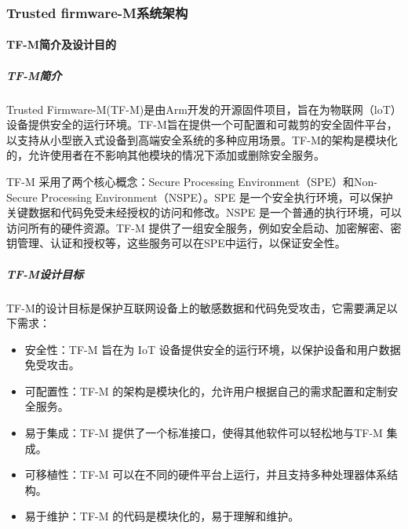 \documentclass[12pt,a4paper]{ctexart}
\numberwithin{figure}{section}
\begin{document}
\subsubsection{Trusted firmware-M系统架构}
\paragraph{TF-M简介及设计目的}
\subparagraph{TF-M简介}
\par Trusted Firmware-M(TF-M)是由Arm开发的开源固件项目，旨在为物联网（loT）设备提供安全的运行环境。TF-M旨在提供一个可配置和可裁剪的安全固件平台，以支持从小型嵌入式设备到高端安全系统的多种应用场景。TF-M的架构是模块化的，允许使用者在不影响其他模块的情况下添加或删除安全服务。
\par TF-M 采用了两个核心概念：Secure Processing Environment（SPE）和Non-Secure Processing Environment（NSPE）。SPE 是一个安全执行环境，可以保护关键数据和代码免受未经授权的访问和修改。NSPE 是一个普通的执行环境，可以访问所有的硬件资源。TF-M 提供了一组安全服务，例如安全启动、加密解密、密钥管理、认证和授权等，这些服务可以在SPE中运行，以保证安全性。
\subparagraph{TF-M设计目标}
\par TF-M的设计目标是保护互联网设备上的敏感数据和代码免受攻击，它需要满足以下需求：
\begin{itemize}
    \item 安全性：TF-M 旨在为 IoT 设备提供安全的运行环境，以保护设备和用户数据免受攻击。
    \item 可配置性：TF-M 的架构是模块化的，允许用户根据自己的需求配置和定制安全服务。
    \item 易于集成：TF-M 提供了一个标准接口，使得其他软件可以轻松地与TF-M 集成。
    \item 可移植性：TF-M 可以在不同的硬件平台上运行，并且支持多种处理器体系结构。
    \item 易于维护：TF-M 的代码是模块化的，易于理解和维护。
\end{itemize}
\end{document}

